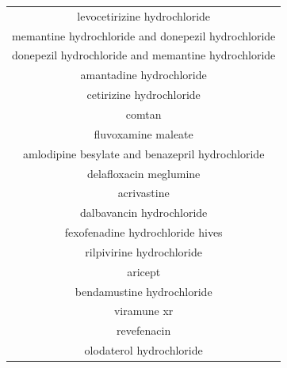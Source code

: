 \documentclass{article}
\newcommand{\lgc}[1]{\cellcolor[gray]{0.85}#1}
\begin{document}
\begin{table}[t!]
\begin{tabular}[t]{c}
levocetirizine hydrochloride \\
\lgc{memantine hydrochloride and donepezil hydrochloride\cite{rejdak2020adamantanes}} \\
\lgc{donepezil hydrochloride and memantine hydrochloride\cite{rejdak2020adamantanes}} \\
\lgc{amantadine hydrochloride\cite{rejdak2020adamantanes}} \\
cetirizine hydrochloride \\
comtan \\
\lgc{fluvoxamine maleate\cite{stopcovid}} \\
\lgc{amlodipine besylate and benazepril hydrochloride\cite{Zhang2020.04.08.20047134}} \\
delafloxacin meglumine \\
acrivastine \\
dalbavancin hydrochloride \\
\lgc{fexofenadine hydrochloride hives\cite{Farag2020}} \\
rilpivirine hydrochloride \\
aricept \\
bendamustine hydrochloride \\
viramune xr \\
revefenacin \\
olodaterol hydrochloride \\
\hline
\end{tabular}
\end{table}
\end{document}
